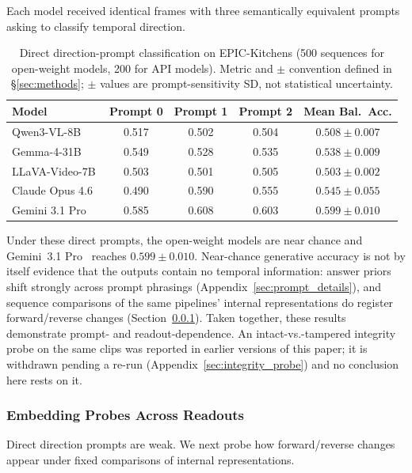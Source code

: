 \documentclass{article}
\theoremstyle{remark}
\begin{document}
Each model received identical frames with three semantically equivalent prompts asking to classify temporal direction.

\begin{table}[ht]
\centering
\caption{Direct direction-prompt classification on EPIC-Kitchens (500 sequences for open-weight models, 200 for API models). Metric and $\pm$ convention defined in \S\ref{sec:methods}; $\pm$ values are prompt-sensitivity SD, not statistical uncertainty.}
\label{tab:vlm_generative}
\begin{tabular}{lcccc}
\toprule
\textbf{Model} & \textbf{Prompt 0} & \textbf{Prompt 1} & \textbf{Prompt 2} & \textbf{Mean Bal.\ Acc.} \\
\midrule
Qwen3-VL-8B & 0.517 & 0.502 & 0.504 & $0.508 \pm 0.007$ \\
Gemma-4-31B & 0.549 & 0.528 & 0.535 & $0.538 \pm 0.009$ \\
LLaVA-Video-7B & 0.503 & 0.501 & 0.505 & $0.503 \pm 0.002$ \\
\midrule
Claude Opus 4.6~\cite{claude4opus} & 0.490 & 0.590 & 0.555 & $0.545 \pm 0.055$ \\
Gemini 3.1 Pro & 0.585 & 0.608 & 0.603 & $0.599 \pm 0.010$ \\
\bottomrule
\end{tabular}
\end{table}

Under these direct prompts, the open-weight models are near chance and Gemini~3.1 Pro~\cite{gemini31pro} reaches $0.599 \pm 0.010$. Near-chance generative accuracy is not by itself evidence that the outputs contain no temporal information: answer priors shift strongly across prompt phrasings (Appendix~\ref{sec:prompt_details}), and sequence comparisons of the same pipelines' internal representations do register forward/reverse changes (Section~\ref{sec:vlm_embedding}). Taken together, these results demonstrate prompt- and readout-dependence. An intact-vs.-tampered integrity probe on the same clips was reported in earlier versions of this paper; it is withdrawn pending a re-run (Appendix~\ref{sec:integrity_probe}) and no conclusion here rests on it.

\subsubsection{Embedding Probes Across Readouts}
\label{sec:vlm_embedding}

Direct direction prompts are weak. We next probe how forward/reverse changes appear under fixed comparisons of internal representations.
\end{document}
